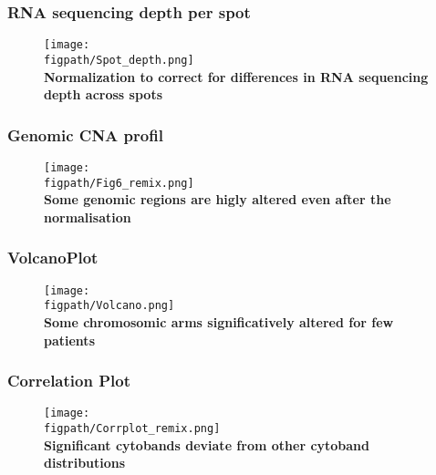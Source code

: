 \documentclass[aspectratio=169]{beamer}
\newcommand{\figpath}{/mnt/datadisk/Jordan/Delivrables/Rapports/Rapport_stage/Figures/Sans_légendes}
\begin{document}
\begin{frame}
	\frametitle<presentation>{RNA sequencing depth per spot}
	\begin{figure}
		\centering
            \texttt{[image: \\figpath/Spot\_depth.png]}\\
            \centering
            \textbf{Normalization to correct for differences in RNA sequencing depth across spots}
		\label{fig:depth}
	\end{figure}
\end{frame}

\begin{frame}
	\frametitle<presentation>{Genomic CNA profil}
	\begin{figure}
		\centering
			\texttt{[image: \\figpath/Fig6\_remix.png]}\\
            \centering
            \textbf{Some genomic regions are higly altered even after the normalisation}
		\label{fig:shiftplot}
	\end{figure}
\end{frame}

\begin{comment}
\begin{frame}
	\frametitle<presentation>{Statistical tests}
	\begin{figure}
		\centering
			\texttt{[image: \\figpath/Fig7.png]}\\
            \centering
            \textbf{Statistical testing by chromosomic arms reveal several regions significatively altered}
		\label{fig:barplot}
	\end{figure}
\end{frame}
\end{comment}





\begin{frame}
	\frametitle<presentation>{VolcanoPlot}
	\begin{figure}
		\centering
			\texttt{[image: \\figpath/Volcano.png]}\\
            \centering
            \textbf{Some chromosomic arms significatively altered for few patients}
		\label{fig:all-arms}
	\end{figure}
\end{frame}

\begin{frame}
	\frametitle<presentation>{Correlation Plot}
	\begin{figure}
		\centering
			\texttt{[image: \\figpath/Corrplot\_remix.png]}\\
            \centering
            \textbf{Significant cytobands deviate from other cytoband distributions}
		\label{fig:corrplot}
	\end{figure}
\end{frame}
\end{document}
